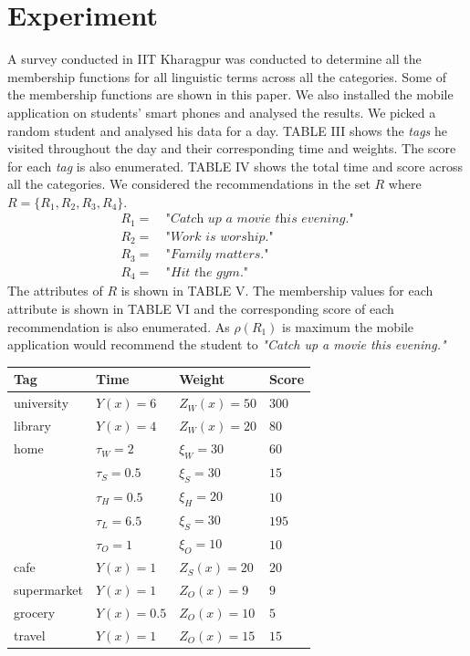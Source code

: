 \documentclass[conference]{IEEEtran}
\begin{document}
\section{Experiment}
A survey conducted in IIT Kharagpur was conducted to determine all the membership functions for all linguistic terms across all the categories. Some of the membership functions are shown in this paper. We also installed the mobile application on students' smart phones and analysed the results. We picked a random student and analysed his data for a day. TABLE III shows the \textit{tags} he visited throughout the day and their corresponding time and weights. The score for each \textit{tag} is also enumerated. TABLE IV shows the total time and score across all the categories. We considered the recommendations in the set $R$ where $R = \{R_1, R_2, R_3, R_4\}$.
\begin{align*}
R_1 =\ &\textit{"Catch up a movie this evening."}\\
R_2 =\ &\textit{"Work is worship."}\\
R_3 =\ &\textit{"Family matters."}\\
R_4 =\ &\textit{"Hit the gym."}
\end{align*}
The attributes of $R$ is shown in TABLE V. The membership values for each attribute is shown in TABLE VI and the corresponding score of each recommendation is also enumerated. As $\rho(R_1)$ is maximum the mobile application would recommend the student to \textit{"Catch up a movie this evening."}
\begin{table}
\small
{}
\begin{center}
\def\arraystretch{1.7}
\begin{tabular}{| l | l | l | l |}
\hline
\bf Tag & \bf Time & \bf Weight & \bf Score \\
\hline
university & $Y(x)=6$ & $Z_W(x) = 50$ & $300$ \\
\hline
library & $Y(x)=4$ & $Z_W(x) = 20$ & $80$ \\
\hline
home & $\tau_W=2$ & $\xi_W=30$ & $60$ \\
& $\tau_S=0.5$ & $\xi_S=30$ & $15$ \\
& $\tau_H=0.5$ & $\xi_H=20$ & $10$ \\
& $\tau_L=6.5$ & $\xi_S=30$ & $195$ \\
& $\tau_O=1$ & $\xi_O=10$ & $10$ \\
\hline
cafe & $Y(x)=1$ & $Z_S(x)=20$ & $20$ \\
\hline
supermarket & $Y(x)=1$ & $Z_O(x)=9$ & $9$ \\
\hline
grocery & $Y(x)=0.5$ & $Z_O(x)=10$ & $5$ \\
\hline
travel & $Y(x)=1$ & $Z_O(x)=15$ & $15$ \\
\hline
\end{tabular}
\end{center}
\end{table}
\end{document}
